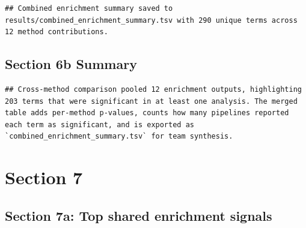\documentclass[
]{article}
\newenvironment{Shaded}{\begin{snugshade}}{\end{snugshade}}
\newcommand{\FunctionTok}[1]{\textcolor[rgb]{0.13,0.29,0.53}{\textbf{#1}}}
\newcommand{\NormalTok}[1]{#1}
\newcommand{\OtherTok}[1]{\textcolor[rgb]{0.56,0.35,0.01}{#1}}
\newcommand{\SpecialCharTok}[1]{\textcolor[rgb]{0.81,0.36,0.00}{\textbf{#1}}}
\newcommand{\StringTok}[1]{\textcolor[rgb]{0.31,0.60,0.02}{#1}}
\begin{document}
\begin{Shaded}
\end{Shaded}

\begin{verbatim}
## Combined enrichment summary saved to results/combined_enrichment_summary.tsv with 290 unique terms across 12 method contributions.
\end{verbatim}

\subsection{Section 6b Summary}\label{section-6b-summary}

\begin{verbatim}
## Cross-method comparison pooled 12 enrichment outputs, highlighting 203 terms that were significant in at least one analysis. The merged table adds per-method p-values, counts how many pipelines reported each term as significant, and is exported as `combined_enrichment_summary.tsv` for team synthesis.
\end{verbatim}

\section{Section 7}\label{section-7}

\subsection{Section 7a: Top shared enrichment
signals}\label{section-7a-top-shared-enrichment-signals}
\end{document}
